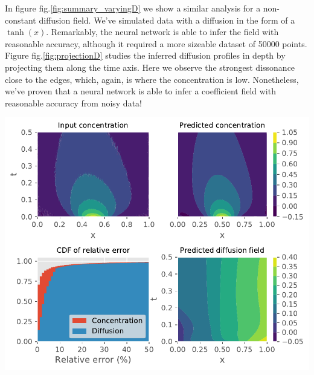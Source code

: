 \documentclass[12pt,a4paper,]{Dissertate}
\let\origfigure\figure
\let\endorigfigure\endfigure
\renewenvironment{figure}[1][2] {
    \expandafter\origfigure\expandafter[H]
} {
    \endorigfigure
}
\begin{document}
In figure fig.\ref{fig:summary_varyingD} we show a similar analysis for
a non-constant diffusion field. We've simulated data with a diffusion in
the form of a \(\tanh(x)\). Remarkably, the neural network is able to
infer the field with reasonable accuracy, although it required a more
sizeable dataset of 50000 points. Figure fig.\ref{fig:projectionD}
studies the inferred diffusion profiles in depth by projecting them
along the time axis. Here we observe the strongest dissonance close to
the edges, which, again, is where the concentration is low. Nonetheless,
we've proven that a neural network is able to infer a coefficient field
with reasonable accuracy from noisy data!

\begin{figure}
\hypertarget{fig:summary_varyingD}{%
\centering
\includegraphics{source/figures/pdf/summary_varyingD_varyingPINN.pdf}
\caption{We show the training data and predicted concentration profile
in the upper left and right panels. The lower right panel shows the
inferred diffusion field while the lower left panel shows the CDF of the
relative error of the diffusion and
concentration.}\label{fig:summary_varyingD}
}
\end{figure}
\end{document}
